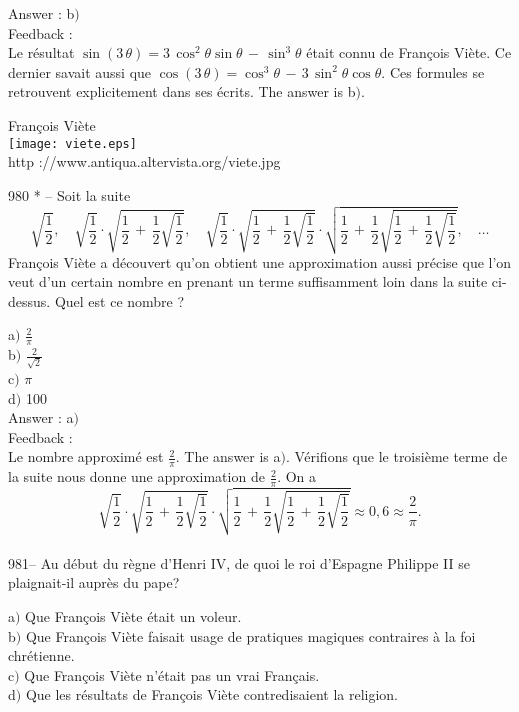 \documentclass[letterpaper, 12pt]{article}
\begin{document}
Answer : b$)$\\

Feedback : \\
Le r\'esultat
$\sin(3\,\theta)=3\,\cos^2\theta\sin\theta\,-\,\sin^3\theta$ \'etait
connu de Fran\c cois Vi\`ete. Ce dernier savait aussi que
$\cos(3\,\theta)=\cos^3\theta\,-\,3\,\sin^2\theta\cos\theta$. Ces
formules se retrouvent explicitement dans ses \'ecrits.
The answer is b$)$.\\

        \begin{center}
        Fran\c cois Vi\`ete\\
    \texttt{[image: viete.eps]}\\
        {\footnotesize http ://www.antiqua.altervista.org/viete.jpg}
    \end{center}

980 * -- Soit la suite
$$\displaystyle\sqrt{\frac12},\quad\displaystyle\sqrt{\frac12}\cdot\displaystyle\sqrt{\frac12\,+\,\frac12\sqrt{\frac12}},\quad
\displaystyle\sqrt{\frac12}\cdot\displaystyle\sqrt{\frac12\,+\,\frac12\sqrt{\frac12}}\cdot
\displaystyle\sqrt{\frac12\,+\,\frac12\sqrt{\frac12\,+\,\frac12\sqrt{\frac12}}},\quad\ldots$$
Fran\c cois Vi\`ete a d\'ecouvert qu'on obtient une approximation
aussi pr\'ecise que l'on veut d'un certain nombre en prenant un
terme suffisamment loin dans la suite ci-dessus. Quel est ce nombre
?

a$)$ $\frac2{\pi}$\\
b$)$ $\frac2{\sqrt2}$ \\
c$)$ $\pi$ \\
d$)$ 100\\

Answer : a$)$\\

Feedback : \\
Le nombre approxim\'e est $\frac2{\pi}$. The answer is a$)$.
V\'erifions que le troisi\`eme terme de la suite nous donne une
approximation de $\frac{2}{\pi}$. On a
$$\displaystyle\sqrt{\frac12}\cdot\displaystyle\sqrt{\frac12\,+\,\frac12\sqrt{\frac12}}\cdot
\displaystyle\sqrt{\frac12\,+\,\frac12\sqrt{\frac12\,+\,\frac12\sqrt{\frac12}}}\approx0,6\approx\frac2{\pi}.$$
\\

981-- Au d\'ebut du r\`egne d'Henri IV, de quoi le roi d'Espagne
Philippe II se plaignait-il aupr\`es du pape?

a$)$ Que Fran\c cois Vi\`ete \'etait un voleur. \\
b$)$ Que Fran\c cois Vi\`ete faisait usage de pratiques magiques contraires
\`a la foi chr\'etienne. \\
c$)$ Que Fran\c cois Vi\`ete n'\'etait pas un vrai Fran\c cais. \\
d$)$ Que les r\'esultats de Fran\c cois Vi\`ete contredisaient la
religion.\\
\end{document}
